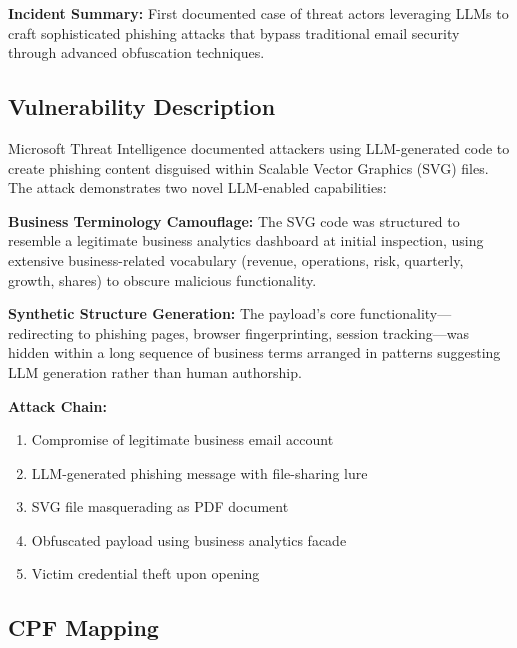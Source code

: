 \documentclass[11pt,a4paper]{article}
\begin{document}
\textbf{Incident Summary:} First documented case of threat actors leveraging LLMs to craft sophisticated phishing attacks that bypass traditional email security through advanced obfuscation techniques.

\subsection{Vulnerability Description}

Microsoft Threat Intelligence documented attackers using LLM-generated code to create phishing content disguised within Scalable Vector Graphics (SVG) files. The attack demonstrates two novel LLM-enabled capabilities:

\textbf{Business Terminology Camouflage:} The SVG code was structured to resemble a legitimate business analytics dashboard at initial inspection, using extensive business-related vocabulary (revenue, operations, risk, quarterly, growth, shares) to obscure malicious functionality.

\textbf{Synthetic Structure Generation:} The payload's core functionality—redirecting to phishing pages, browser fingerprinting, session tracking—was hidden within a long sequence of business terms arranged in patterns suggesting LLM generation rather than human authorship.

\textbf{Attack Chain:}
\begin{enumerate}
\item Compromise of legitimate business email account
\item LLM-generated phishing message with file-sharing lure
\item SVG file masquerading as PDF document
\item Obfuscated payload using business analytics facade
\item Victim credential theft upon opening
\end{enumerate}

\subsection{CPF Mapping}
\end{document}
